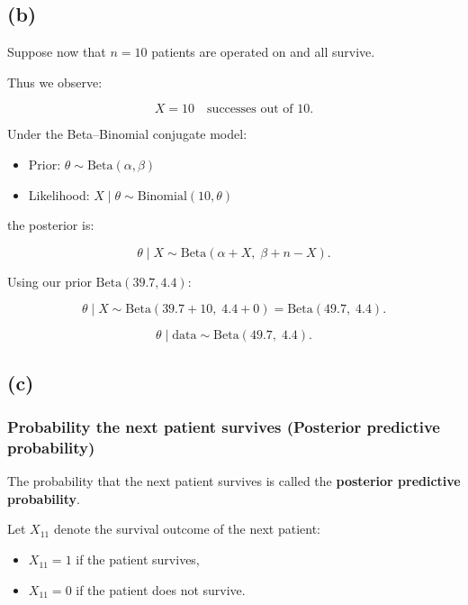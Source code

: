 \documentclass[
  letterpaper,
  DIV=11,
  numbers=noendperiod]{scrartcl}
\providecommand{\tightlist}{%
  \setlength{\itemsep}{0pt}\setlength{\parskip}{0pt}}\usepackage{longtable,booktabs,array}
\begin{document}
\subsection{(b)}\label{b}

Suppose now that \(n=10\) patients are operated on and all survive.

Thus we observe:

\[
X = 10 \quad \text{successes out of } 10.
\]

Under the Beta--Binomial conjugate model:

\begin{itemize}
\tightlist
\item
  Prior: \(\theta \sim \text{Beta}(\alpha,\beta)\)
\item
  Likelihood: \(X \mid \theta \sim \text{Binomial}(10,\theta)\)
\end{itemize}

the posterior is:

\[
\theta \mid X \sim \text{Beta}(\alpha + X,\; \beta + n - X).
\]

Using our prior \(\text{Beta}(39.7,4.4)\):

\[
\theta \mid X
\sim
\text{Beta}(39.7 + 10,\; 4.4 + 0)
=
\text{Beta}(49.7,\; 4.4).
\]

\[
\boxed{
\theta \mid \text{data} \sim \text{Beta}(49.7,\;4.4).
}
\]

\subsection{(c)}\label{c}

\subsubsection{Probability the next patient survives (Posterior
predictive
probability)}\label{probability-the-next-patient-survives-posterior-predictive-probability}

The probability that the next patient survives is called the
\textbf{posterior predictive probability}.

Let \(X_{11}\) denote the survival outcome of the next patient:

\begin{itemize}
\tightlist
\item
  \(X_{11} = 1\) if the patient survives,
\item
  \(X_{11} = 0\) if the patient does not survive.
\end{itemize}
\end{document}
